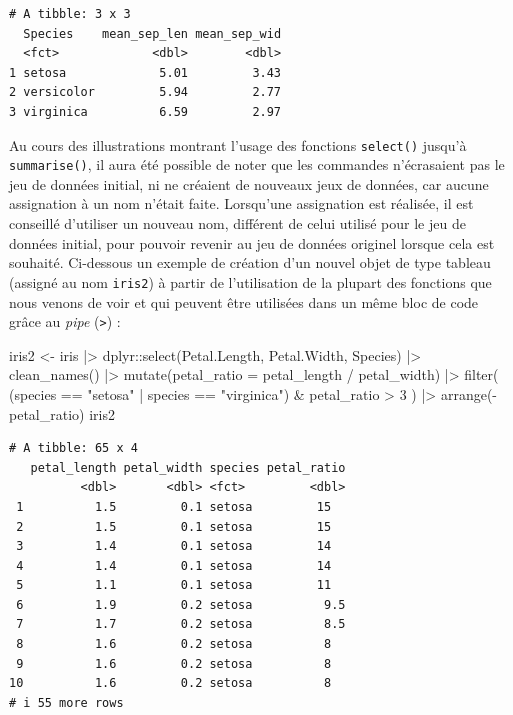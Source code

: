 \documentclass[
  letterpaper,
]{book}
\newenvironment{Shaded}{\begin{snugshade}}{\end{snugshade}}
\newcommand{\AttributeTok}[1]{\textcolor[rgb]{0.40,0.45,0.13}{#1}}
\newcommand{\DecValTok}[1]{\textcolor[rgb]{0.68,0.00,0.00}{#1}}
\newcommand{\FunctionTok}[1]{\textcolor[rgb]{0.28,0.35,0.67}{#1}}
\newcommand{\NormalTok}[1]{\textcolor[rgb]{0.00,0.23,0.31}{#1}}
\newcommand{\OtherTok}[1]{\textcolor[rgb]{0.00,0.23,0.31}{#1}}
\newcommand{\SpecialCharTok}[1]{\textcolor[rgb]{0.37,0.37,0.37}{#1}}
\newcommand{\StringTok}[1]{\textcolor[rgb]{0.13,0.47,0.30}{#1}}
\begin{document}
\begin{verbatim}
# A tibble: 3 x 3
  Species    mean_sep_len mean_sep_wid
  <fct>             <dbl>        <dbl>
1 setosa             5.01         3.43
2 versicolor         5.94         2.77
3 virginica          6.59         2.97
\end{verbatim}

Au cours des illustrations montrant l'usage des fonctions
\texttt{select()} jusqu'à \texttt{summarise()}, il aura été possible de
noter que les commandes n'écrasaient pas le jeu de données initial, ni
ne créaient de nouveaux jeux de données, car aucune assignation à un nom
n'était faite. Lorsqu'une assignation est réalisée, il est conseillé
d'utiliser un nouveau nom, différent de celui utilisé pour le jeu de
données initial, pour pouvoir revenir au jeu de données originel lorsque
cela est souhaité. Ci-dessous un exemple de création d'un nouvel objet
de type tableau (assigné au nom \texttt{iris2}) à partir de
l'utilisation de la plupart des fonctions que nous venons de voir et qui
peuvent être utilisées dans un même bloc de code grâce au \emph{pipe}
(\texttt{\textbar{}\textgreater{}}) :

\begin{Shaded}
\begin{Highlighting}[]
\NormalTok{iris2 }\OtherTok{\textless{}{-}}
\NormalTok{  iris }\SpecialCharTok{|\textgreater{}}
\NormalTok{  dplyr}\SpecialCharTok{::}\FunctionTok{select}\NormalTok{(Petal.Length, Petal.Width, Species) }\SpecialCharTok{|\textgreater{}}
  \FunctionTok{clean\_names}\NormalTok{() }\SpecialCharTok{|\textgreater{}}
  \FunctionTok{mutate}\NormalTok{(}\AttributeTok{petal\_ratio =}\NormalTok{ petal\_length }\SpecialCharTok{/}\NormalTok{ petal\_width) }\SpecialCharTok{|\textgreater{}}
  \FunctionTok{filter}\NormalTok{(}
\NormalTok{    (species }\SpecialCharTok{==} \StringTok{"setosa"} \SpecialCharTok{|}
\NormalTok{            species }\SpecialCharTok{==} \StringTok{"virginica"}\NormalTok{) }\SpecialCharTok{\&}\NormalTok{ petal\_ratio }\SpecialCharTok{\textgreater{}} \DecValTok{3}
\NormalTok{    ) }\SpecialCharTok{|\textgreater{}}
  \FunctionTok{arrange}\NormalTok{(}\SpecialCharTok{{-}}\NormalTok{petal\_ratio)}
\NormalTok{iris2}
\end{Highlighting}
\end{Shaded}

\begin{verbatim}
# A tibble: 65 x 4
   petal_length petal_width species petal_ratio
          <dbl>       <dbl> <fct>         <dbl>
 1          1.5         0.1 setosa         15  
 2          1.5         0.1 setosa         15  
 3          1.4         0.1 setosa         14  
 4          1.4         0.1 setosa         14  
 5          1.1         0.1 setosa         11  
 6          1.9         0.2 setosa          9.5
 7          1.7         0.2 setosa          8.5
 8          1.6         0.2 setosa          8  
 9          1.6         0.2 setosa          8  
10          1.6         0.2 setosa          8  
# i 55 more rows
\end{verbatim}
\end{document}
